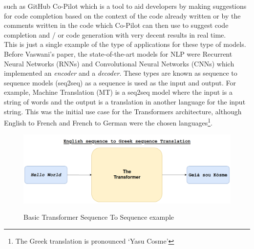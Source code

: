 such as GitHub Co-Pilot which is a tool to aid developers by making suggestions for code completion based on the context of the code already written or
by the comments written in the code which Co-Pilot can then use to suggest code completion and / or code generation with very decent results in real time.\\
This is just a single example of the type of applications for these type of models.
\bigbreak
Before Vaswani's paper, the state-of-the-art models for NLP were Recurrent Neural Networks (RNNs) and Convolutional Neural Networks (CNNs) which implemented an
\emph{encoder} and a \emph{decoder}. These types are known as sequence to sequence models (seq2seq) as a sequence is used as the input and output.
\bigbreak
For example, Machine Translation (MT) is a seq2seq model where the input is a string of words and the output is a translation in another language for the
input string. This was the initial use case for the Transformers architecture, although English to French and French to German were the chosen
languages\footnote{The Greek translation is pronounced `Yasu Cosme'}.
\begin{figure}[H]
	\centering
	\includegraphics[width=0.7\linewidth]{figures/basic_transformer.png}
	\label{fig:basic_transformer}
	\caption{Basic Transformer Sequence To Sequence example}
\end{figure}
